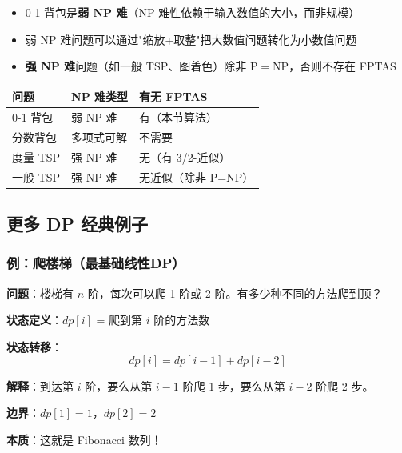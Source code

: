 \documentclass[12pt, a4paper]{ctexart}
\begin{document}
\begin{keypoint}

\begin{itemize}
    \item 0-1 背包是\textbf{弱 NP 难}（NP 难性依赖于输入数值的大小，而非规模）
    \item 弱 NP 难问题可以通过"缩放+取整"把大数值问题转化为小数值问题
    \item \textbf{强 NP 难}问题（如一般 TSP、图着色）除非 $\mathrm{P}=\mathrm{NP}$，否则不存在 FPTAS
\end{itemize}

\begin{center}
\begin{tabular}{lll}
\toprule
\textbf{问题} & \textbf{NP 难类型} & \textbf{有无 FPTAS} \\
\midrule
0-1 背包 & 弱 NP 难 & 有（本节算法） \\
分数背包 & 多项式可解 & 不需要 \\
度量 TSP & 强 NP 难 & 无（有 3/2-近似） \\
一般 TSP & 强 NP 难 & 无近似（除非 P=NP） \\
\bottomrule
\end{tabular}
\end{center}

\end{keypoint}

\subsection{更多 DP 经典例子}

\subsubsection{例：爬楼梯（最基础线性DP）}

\begin{blackboard}[爬楼梯问题]

\textbf{问题}：楼梯有 $n$ 阶，每次可以爬 1 阶或 2 阶。有多少种不同的方法爬到顶？

\textbf{状态定义}：$dp[i]$ = 爬到第 $i$ 阶的方法数

\textbf{状态转移}：
\[
dp[i] = dp[i-1] + dp[i-2]
\]

\textbf{解释}：到达第 $i$ 阶，要么从第 $i-1$ 阶爬 1 步，要么从第 $i-2$ 阶爬 2 步。

\textbf{边界}：$dp[1] = 1$，$dp[2] = 2$

\textbf{本质}：这就是 Fibonacci 数列！

\end{blackboard}
\end{document}

